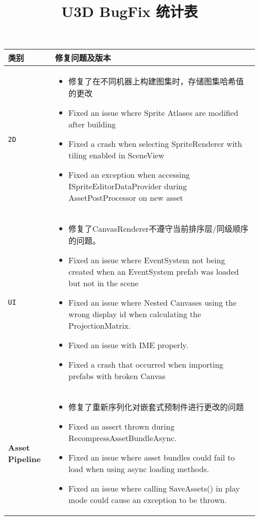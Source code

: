 \documentclass[UTF8,a4paper,12pt]{ctexart}
\title{\heiti U3D BugFix 统计表}
\begin{document}
 	\maketitle

		\begin{longtable}{p{2cm}|p{14cm}}
			\toprule
				类别 &  修复问题及版本	\\
			\midrule
				\verb|2D| &  
											\begin{itemize}
												\item 修复了在不同机器上构建图集时，存储图集哈希值的更改
												\item Fixed an issue where Sprite Atlases are modified after building
												\item Fixed a crash when selecting SpriteRenderer with tiling enabled in SceneView
												\item Fixed an exception when accessing ISpriteEditorDataProvider during AssetPostProcessor on new asset
											\end{itemize}	\\
				\hline
				\verb|UI| & 
											\begin{itemize}
											\item 修复了CanvasRenderer不遵守当前排序层/同级顺序的问题。
											\item Fixed an issue where EventSystem not being created when an EventSystem prefab was loaded but not in the scene
											\item Fixed an issue where Nested Canvases using the wrong display id when calculating the ProjectionMatrix. 
											\item Fixed an issue with IME properly. 
											\item Fixed a crash that occurred when importing prefabs with broken Canvas
											\end{itemize}			\\
				\hline
				\textbf{Asset 
				Pipeline} & 	
											\begin{itemize}
											\item 修复了重新序列化对嵌套式预制件进行更改的问题
											\item Fixed an assert thrown during RecompressAssetBundleAsync.
											\item Fixed an issue where asset bundles could fail to load when using async loading methods.
											\item Fixed an issue where calling SaveAssets() in play mode could cause an exception to be thrown.

\end{itemize}
\end{longtable}
\end{document}
